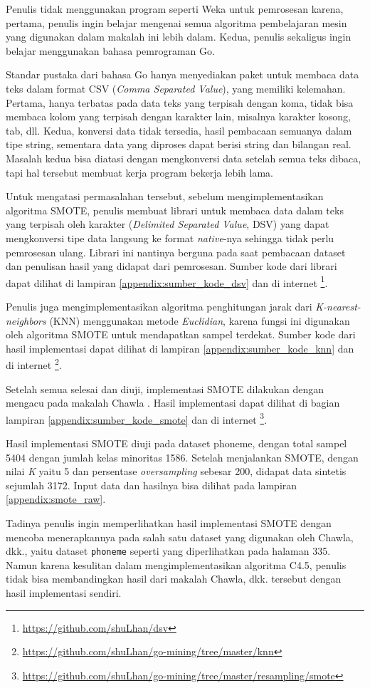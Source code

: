 Penulis tidak menggunakan program seperti Weka untuk pemrosesan karena, pertama, penulis ingin belajar mengenai semua algoritma pembelajaran mesin yang digunakan dalam makalah ini lebih dalam. Kedua, penulis sekaligus ingin belajar menggunakan bahasa pemrograman Go.

Standar pustaka dari bahasa Go hanya menyediakan paket untuk membaca data teks dalam format CSV (\textit{Comma Separated Value}), yang memiliki kelemahan. Pertama, hanya terbatas pada data teks yang terpisah dengan koma, tidak bisa membaca kolom yang terpisah dengan karakter lain, misalnya karakter kosong, tab, dll. Kedua, konversi data tidak tersedia, hasil pembacaan semuanya dalam tipe string, sementara data yang diproses dapat berisi string dan bilangan real. Masalah kedua bisa diatasi dengan mengkonversi data setelah semua teks dibaca, tapi hal tersebut membuat kerja program bekerja lebih lama.

Untuk mengatasi permasalahan tersebut, sebelum mengimplementasikan algoritma SMOTE, penulis membuat librari untuk membaca data dalam teks yang terpisah oleh karakter (\textit{Delimited Separated Value}, DSV) yang dapat mengkonversi tipe data langsung ke format \textit{native}-nya sehingga tidak perlu pemrosesan ulang.
Librari ini nantinya berguna pada saat pembacaan dataset dan penulisan hasil yang didapat dari pemrosesan. Sumber kode dari librari dapat dilihat di lampiran
\ref{appendix:sumber_kode_dsv}
dan di internet
\footnote{\url{https://github.com/shuLhan/dsv}}. 

Penulis juga mengimplementasikan algoritma penghitungan jarak dari \textit{K-nearest-neighbors} (KNN) menggunakan metode \textit{Euclidian}, karena fungsi ini digunakan oleh algoritma SMOTE untuk mendapatkan sampel terdekat. Sumber kode dari hasil implementasi dapat dilihat di lampiran
\ref{appendix:sumber_kode_knn}
dan di internet
\footnote{\url{https://github.com/shuLhan/go-mining/tree/master/knn}}.

Setelah semua selesai dan diuji, implementasi SMOTE dilakukan dengan mengacu pada makalah Chawla \cite{chawla2002smote}. Hasil implementasi dapat dilihat di bagian lampiran
\ref{appendix:sumber_kode_smote}
dan di internet
\footnote{\url{https://github.com/shuLhan/go-mining/tree/master/resampling/smote}}.

Hasil implementasi SMOTE diuji pada dataset phoneme, dengan total sampel 5404 dengan jumlah kelas minoritas 1586.
Setelah menjalankan SMOTE, dengan nilai \textit{K} yaitu 5 dan persentase \textit{oversampling} sebesar 200, didapat data sintetis sejumlah 3172.
Input data dan hasilnya bisa dilihat pada lampiran
\ref{appendix:smote_raw}.

Tadinya penulis ingin memperlihatkan hasil implementasi SMOTE dengan mencoba menerapkannya pada salah satu dataset yang digunakan oleh Chawla, dkk.\cite{chawla2002smote}, yaitu dataset \texttt{phoneme} seperti yang diperlihatkan pada halaman 335.
Namun karena kesulitan dalam mengimplementasikan algoritma C4.5, penulis tidak bisa membandingkan hasil dari makalah Chawla, dkk. tersebut dengan hasil implementasi sendiri.
